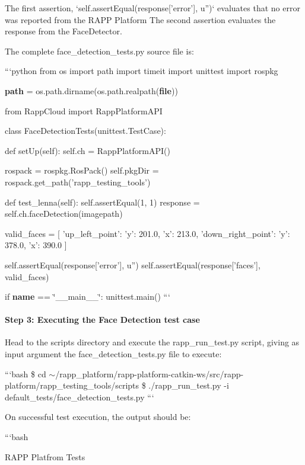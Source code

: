 The first assertion, `self.assert\-Equal(response\mbox{[}'error'\mbox{]}, u'')` evaluates that no error was reported from the R\-A\-P\-P Platform The second assertion evaluates the response from the Face\-Detector.

The complete face\-\_\-detection\-\_\-tests.\-py source file is\-:

```python from os import path import timeit import unittest import rospkg

{\bfseries path} = os.\-path.\-dirname(os.\-path.\-realpath({\bfseries file}))

from Rapp\-Cloud import Rapp\-Platform\-A\-P\-I

class Face\-Detection\-Tests(unittest.\-Test\-Case)\-: \begin{DoxyVerb}def setUp(self):
    self.ch = RappPlatformAPI()

    rospack = rospkg.RosPack()
    self.pkgDir = rospack.get_path('rapp_testing_tools')

def test_lenna(self):
    self.assertEqual(1, 1)
    response = self.ch.faceDetection(imagepath)

    valid_faces = [{
        'up_left_point': {'y': 201.0, 'x': 213.0},
        'down_right_point': {'y': 378.0, 'x': 390.0}
    }]

    self.assertEqual(response['error'], u'')
    self.assertEqual(response['faces'], valid_faces)
\end{DoxyVerb}


if {\bfseries name} == \char`\"{}\-\_\-\-\_\-main\-\_\-\-\_\-\char`\"{}\-: unittest.\-main() ```

\paragraph*{Step 3\-: Executing the Face Detection test case}

Head to the {\ttfamily scripts} directory and execute the {\ttfamily rapp\-\_\-run\-\_\-test.\-py} script, giving as input argument the {\ttfamily face\-\_\-detection\-\_\-tests.\-py} file to execute\-:

```bash \$ cd $\sim$/rapp\-\_\-platform/rapp-\/platform-\/catkin-\/ws/src/rapp-\/platform/rapp\-\_\-testing\-\_\-tools/scripts \$ ./rapp\-\_\-run\-\_\-test.py -\/i default\-\_\-tests/face\-\_\-detection\-\_\-tests.\-py ```

On successful test execution, the output should be\-:

```bash 

 R\-A\-P\-P Platfrom Tests 





